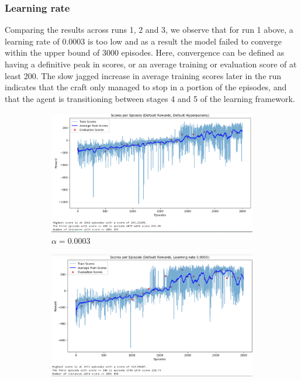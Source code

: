 \documentclass[a4paper, 11pt]{article}
\begin{document}
	\subsubsection{Learning rate}
	Comparing the results across runs 1, 2 and 3, we observe that for run 1 above, a learning rate of 0.0003 is too low and as a result the model failed to converge within the upper bound of 3000 episodes. Here, convergence can be defined as having a definitive peak in scores, or an average training or evaluation score of at least 200. The slow jagged increase in average training scores later in the run indicates that the craft only managed to stop in a portion of the episodes, and that the agent is transitioning between stages 4 and 5 of the learning framework. 
	\begin{figure}[ht]
		\begin{center}
			\begin{subfigure}{0.48\textwidth}
				\includegraphics[width=\linewidth]{data_policygradient/1defaultrun.PNG}
				\caption{$\alpha=0.0003$}
				\label{fig:pg_lr0.0003}
			\end{subfigure}\hfill 
			\begin{subfigure}{0.48\textwidth}
				\includegraphics[width=\linewidth]{data_policygradient/2learningrate0005run.PNG}

\end{subfigure}
\end{center}
\end{figure}
\end{document}
